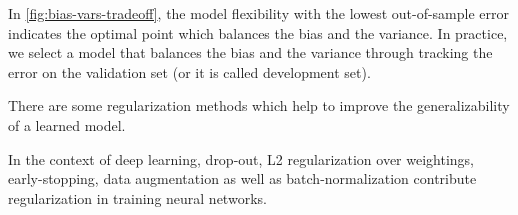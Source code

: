 \documentclass{kthreport}
\begin{document}
In \cref{fig:bias-vars-tradeoff}, the model flexibility with the lowest out-of-sample error
indicates the optimal point which balances the bias and the variance.
In practice, we select a model that balances the bias and the variance through
tracking the error on the validation set (or it is called development set).

There are some regularization methods which help to improve the generalizability of a learned model.

In the context of deep learning, drop-out, L2 regularization over weightings, early-stopping,
data augmentation as well as batch-normalization
contribute regularization in training neural networks. \cite{luo2018-bn-regularization}


\begin{figure}[!ht]
    \begin{minipage}{.5\linewidth}
        \centering
    \end{minipage}%
    \begin{minipage}{.5\linewidth}
        \centering
\end{minipage}
\end{figure}
\end{document}
